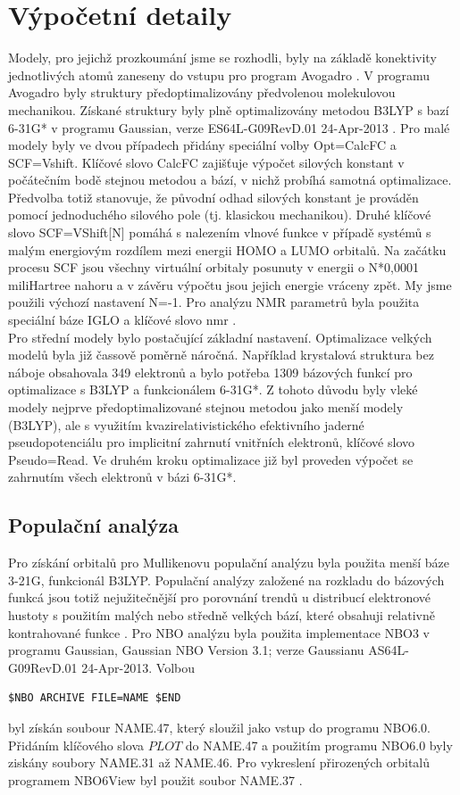 \documentclass[
digital, %
table,   %
lof,     %
lot,     %
oneside,
]{fithesis3}
\begin{document}
\section{Výpočetní detaily}
Modely, pro jejichž prozkoumání jsme se rozhodli, byly na základě konektivity jednotlivých atomů zaneseny do vstupu pro program Avogadro \cite{Avogadro}. V programu Avogadro byly struktury předoptimalizovány předvolenou molekulovou mechanikou. Získané struktury byly plně optimalizovány metodou B3LYP \cite{b3lyp} s bazí 6-31G* v programu Gaussian, verze ES64L-G09RevD.01 24-Apr-2013  \cite{g09}. Pro malé modely byly ve dvou případech přidány speciální volby Opt=CalcFC a SCF=Vshift. Klíčové slovo CalcFC zajišťuje výpočet silových konstant v počátečním bodě stejnou metodou a bází, v nichž probíhá samotná optimalizace. Předvolba totiž stanovuje, že původní odhad silových konstant je prováděn pomocí jednoduchého silového pole (tj. klasickou mechanikou). Druhé klíčové slovo SCF=VShift[N] pomáhá s nalezením vlnové funkce v případě systémů s malým energiovým rozdílem mezi energii HOMO a LUMO orbitalů. Na začátku procesu SCF jsou všechny virtuální orbitaly posunuty v energii o N*0,0001 miliHartree nahoru a v závěru výpočtu jsou jejich energie vráceny zpět. My jsme použili výchozí nastavení N=-1. Pro analýzu NMR parametrů byla použita speciální báze IGLO \cite{iglo} a klíčové slovo nmr \cite{g09}. \\
Pro střední modely bylo postačující základní nastavení. Optimalizace velkých modelů byla již čassově poměrně náročná. Například krystalová struktura bez náboje obsahovala 349 elektronů a bylo potřeba 1309 bázových funkcí pro optimalizace s B3LYP a funkcionálem 6-31G*. Z tohoto důvodu byly vleké modely nejprve předoptimalizované stejnou metodou jako menší modely (B3LYP), ale s využitím kvazirelativistického efektivního jaderné pseudopotenciálu pro implicitní zahrnutí vnitřních elektronů, klíčové slovo Pseudo=Read. Ve druhém kroku optimalizace již byl proveden výpočet se zahrnutím všech elektronů v bázi 6-31G*.\\
\subsection{Populační analýza}
Pro získání orbitalů pro Mullikenovu populační analýzu byla použita menší báze 3-21G, funkcionál B3LYP. Populační analýzy založené na rozkladu do bázových funkcá jsou totiž nejužitečnější pro porovnání trendů u distribucí elektronové hustoty s použitím malých nebo středně velkých bází, které obsahuji relativně kontrahované funkce \cite{jensen2007introduction}.
Pro NBO analýzu byla použita implementace NBO3 v programu Gaussian, Gaussian NBO Version 3.1; verze Gaussianu AS64L-G09RevD.01 24-Apr-2013. Volbou  \begin{lstlisting}[frame=single]
$NBO ARCHIVE FILE=NAME $END
\end{lstlisting}
byl získán soubour NAME.47, který sloužil jako vstup do programu NBO6.0. Přidáním klíčového slova $PLOT$ do NAME.47 a použitím programu NBO6.0 byly ziskány soubory NAME.31 až NAME.46. Pro vykreslení přirozených orbitalů programem NBO6View byl použit soubor NAME.37 \cite{doi:10.1002/jcc.23266}.
\end{document}
